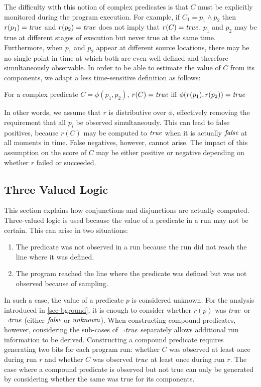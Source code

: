 The difficulty with this notion of complex predicates is that $C$ must be explicitly monitored during the program execution.  For example, if $C_1 = p_1 \wedge p_2$ then $r(p_1) = \mathit{true}$ and $r(p_2) = \mathit{true}$ does not imply that $r(C) = \mathit{true}$.  $p_1$ and $p_2$ may be true at different stages of execution but never true at the same time.  Furthermore, when $p_1$ and $p_2$ appear at different source locations, there may be no single point in time at which both are even well-defined and therefore simultaneously observable.  In order to be able to estimate the value of $C$ from its components, we adapt a less time-sensitive definition as follows:
\begin{defn}
\label{dfn2}
For a complex predicate $C = \phi(p_1, p_2)$, $r(C) = \mathit{true}$ iff $\phi(r(p_1), r(p_2)) = \mathit{true}$
\end{defn}

In other words, we assume that $r$ is distributive over $\phi$, effectively removing the requirement that all $p_i$ be observed simultaneously.  This can lead to false positives, because $r(C)$ may be computed to $\mathit{true}$ when it is actually $\mathit{false}$ at all moments in time.  False negatives, however, cannot arise.  The impact of this assumption on the score of $C$ may be either positive or negative depending on whether $r$ failed or succeeded.

\subsection{Three Valued Logic}
\label{sec-tvl}
This section explains how conjunctions and disjunctions are actually computed.  Three-valued logic is used because the value of a predicate in a run may not be certain. This can arise in two situations:
\begin{enumerate}
\item The predicate was not observed in a run because the run did not reach the line where it was defined.
\item The program reached the line where the predicate was defined but was not observed because of sampling.
\end{enumerate}


In such a case, the value of a predicate $p$ is considered unknown.  For the 
analysis introduced in \autoref{sec-bground}, it is enough to consider whether 
$r(p)$ was $\mathit{true}$ or $\neg \mathit{true}$ (either $\mathit{false}$ or $\mathit{unknown}$).  When 
constructing compound predicates, however, considering the sub-cases of 
$\neg \mathit{true}$ separately allows additional run information to be derived.  
Constructing a compound predicate requires generating two bits for each program
run: whether $C$ was observed at least once during run $r$ and whether $C$ was
observed $\mathit{true}$ at least once during run $r$.  The case where a compound 
predicate is observed but not true can only be generated by considering whether 
the same was true for its components.

